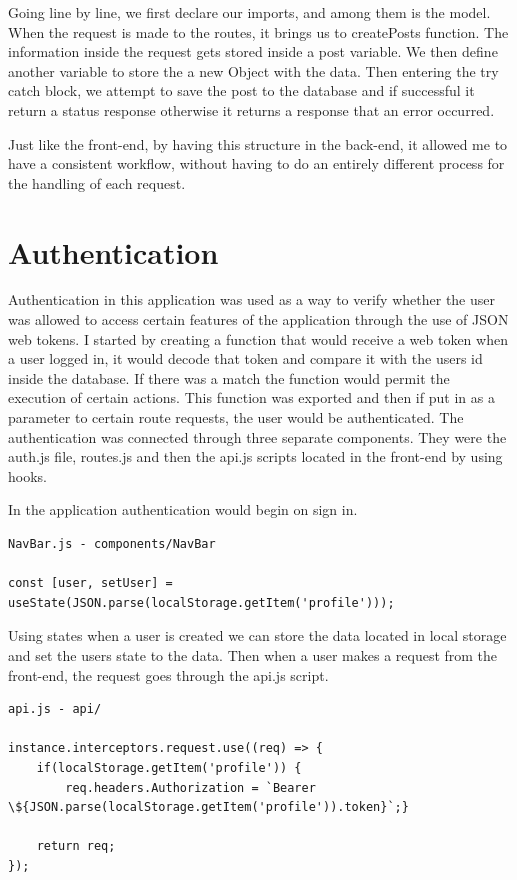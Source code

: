 Going line by line, we first declare our imports, and among them is the model. When the request is made to the routes, it brings us to createPosts function. The information inside the request gets stored inside a post variable. We then define another variable to store the a new Object with the data. Then entering the try catch block, we attempt to save the post to the database and if successful it return a status response otherwise it returns a response that an error occurred.

Just like the front-end, by having this structure in the back-end, it allowed me to have a consistent workflow, without having to do an entirely different process for the handling of each request.

\section{Authentication}
Authentication in this application was used as a way to verify whether the user was allowed to access certain features of the application through the use of JSON web tokens. I started by creating a function that would receive a web token when a user logged in, it would decode that token and compare it with the users id inside the database. If there was a match the function would permit the execution of certain actions. This function was exported and then if put in as a parameter to certain route requests, the user would be authenticated. The authentication was connected through three separate components. They were the auth.js file, routes.js and then the api.js scripts located in the front-end by using hooks.

In the application authentication would begin on sign in.

\begin{verbatim}
NavBar.js - components/NavBar

const [user, setUser] = useState(JSON.parse(localStorage.getItem('profile')));
\end{verbatim}

Using states when a user is created we can store the data located in local storage and set the users state to the data. Then when a user makes a request from the front-end, the request goes through the api.js script.

\begin{verbatim}
api.js - api/

instance.interceptors.request.use((req) => {
    if(localStorage.getItem('profile')) {
        req.headers.Authorization = `Bearer \${JSON.parse(localStorage.getItem('profile')).token}`;}

    return req;
});
\end{verbatim}

